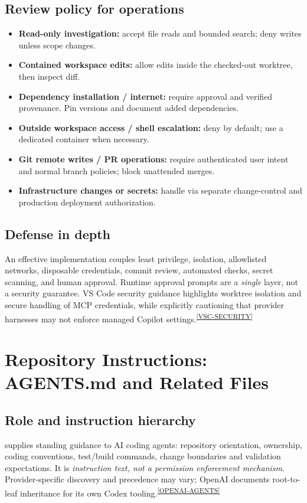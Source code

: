 \documentclass[11pt,letterpaper,oneside]{article}
\newcommand{\cmd}[1]{\path{#1}}
\newcommand{\src}[1]{\textsuperscript{\hyperref[ref:#1]{[#1]}}}
\begin{document}
\subsection{Review policy for operations}
\begin{itemize}
\item \textbf{Read-only investigation:} accept file reads and bounded search; deny writes unless scope changes.
\item \textbf{Contained workspace edits:} allow edits inside the checked-out worktree, then inspect diff.
\item \textbf{Dependency installation / internet:} require approval and verified provenance. Pin versions and document added dependencies.
\item \textbf{Outside workspace access / shell escalation:} deny by default; use a dedicated container when necessary.
\item \textbf{Git remote writes / PR operations:} require authenticated user intent and normal branch policies; block unattended merges.
\item \textbf{Infrastructure changes or secrets:} handle via separate change-control and production deployment authorization.
\end{itemize}

\subsection{Defense in depth}
An effective implementation couples least privilege, isolation, allowlisted networks, disposable credentials, commit review, automated checks, secret scanning, and human approval. Runtime approval prompts are a \emph{single} layer, not a security guarantee. VS Code security guidance highlights worktree isolation and secure handling of MCP credentials, while explicitly cautioning that provider harnesses may not enforce managed Copilot settings.\src{VSC-SECURITY}

\section{Repository Instructions: AGENTS.md and Related Files}
\subsection{Role and instruction hierarchy}
\cmd{AGENTS.md} supplies standing guidance to AI coding agents: repository orientation, ownership, coding conventions, test/build commands, change boundaries and validation expectations. It is \emph{instruction text, not a permission enforcement mechanism}. Provider-specific discovery and precedence may vary; OpenAI documents root-to-leaf inheritance for its own Codex tooling.\src{OPENAI-AGENTS}
\end{document}
